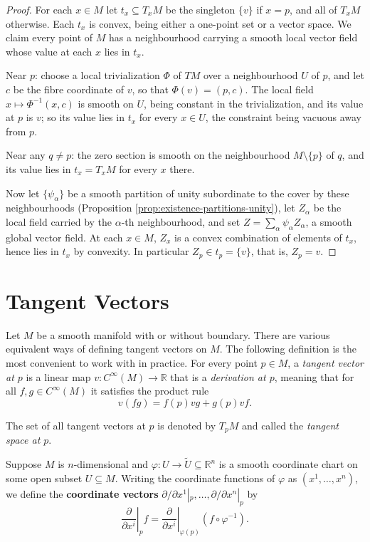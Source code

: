\begin{proof}
\leanok
For each $x \in M$ let $t_x \subseteq T_xM$ be the singleton $\{v\}$ if $x = p$, and all of $T_xM$ otherwise. Each $t_x$ is convex, being either a one-point set or a vector space. We claim every point of $M$ has a neighbourhood carrying a smooth local vector field whose value at each $x$ lies in $t_x$.

Near $p$: choose a local trivialization $\Phi$ of $TM$ over a neighbourhood $U$ of $p$, and let $c$ be the fibre coordinate of $v$, so that $\Phi(v) = (p, c)$. The local field $x \mapsto \Phi^{-1}(x, c)$ is smooth on $U$, being constant in the trivialization, and its value at $p$ is $v$; so its value lies in $t_x$ for every $x \in U$, the constraint being vacuous away from $p$.

Near any $q \neq p$: the zero section is smooth on the neighbourhood $M \setminus \{p\}$ of $q$, and its value lies in $t_x = T_xM$ for every $x$ there.

Now let $\{\psi_\alpha\}$ be a smooth partition of unity subordinate to the cover by these neighbourhoods (Proposition \ref{prop:existence-partitions-unity}), let $Z_\alpha$ be the local field carried by the $\alpha$-th neighbourhood, and set $Z = \sum_\alpha \psi_\alpha Z_\alpha$, a smooth global vector field. At each $x \in M$, $Z_x$ is a convex combination of elements of $t_x$, hence lies in $t_x$ by convexity. In particular $Z_p \in t_p = \{v\}$, that is, $Z_p = v$.
\end{proof}

\section{Tangent Vectors}

Let $M$ be a smooth manifold with or without boundary. There are various equivalent ways of defining tangent vectors on $M$. The following definition is the most
convenient to work with in practice. For every point $p \in M$, a \textit{tangent vector at $p$}
is a linear map $v : C^{\infty}(M) \to \mathbb{R}$ that is a \textit{derivation at $p$}, meaning that for all
$f, g \in C^{\infty}(M)$ it satisfies the product rule
\begin{equation}
v(fg) = f(p)vg + g(p)vf.
\tag{A.1}
\end{equation}

The set of all tangent vectors at $p$ is denoted by $T_p M$ and called the \textit{tangent space
at $p$}.

Suppose $M$ is $n$-dimensional and $\varphi : U \to \tilde{U} \subseteq \mathbb{R}^n$ is a smooth coordinate chart
on some open subset $U \subseteq M$. Writing the coordinate functions of $\varphi$ as $(x^1, \ldots, x^n)$,
we define the \textbf{coordinate vectors} $\partial/\partial x^1|_p, \ldots, \partial/\partial x^n|_p$ by
\begin{equation}
\left.\frac{\partial}{\partial x^i}\right|_p f = \left.\frac{\partial}{\partial x^i}\right|_{\varphi(p)} (f \circ \varphi^{-1}).
\tag{A.2}
\end{equation}

